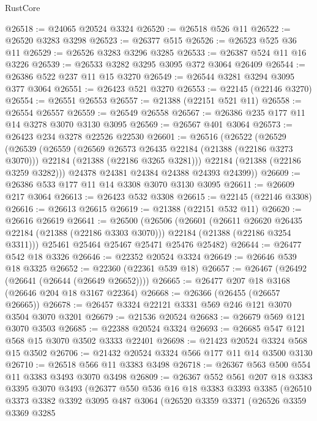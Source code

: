\begin{lexlean}{RustCore}
\begin{coremodule}
@26518 := @24065 @20524 @3324
@26520 := @26518 @526 @11
@26522 := @26520 @3283 @3298
@26523 := @26377 @515
@26526 := @26523 @525 @36 @11
@26529 := @26526 @3283 @3296 @3285
@26533 := @26387 @524 @11 @16 @3226
@26539 := @26533 @3282 @3295 @3095 @372 @3064 @26409
@26544 := @26386 @522 @237 @11 @15 @3270
@26549 := @26544 @3281 @3294 @3095 @377 @3064
@26551 := @26423 @521 @3270
@26553 := @22145 (@22146 @3270)
@26554 := @26551 @26553
@26557 := @21388 (@22151 @521 @11)
@26558 := @26554 @26557
@26559 := @26549 @26558
@26567 := @26386 @235 @177 @11 @14 @3278 @3070 @3130 @3095
@26569 := @26567 @401 @3064
@26573 := @26423 @234 @3278 @22526 @22530
@26601 := @26516
    (@26522
      (@26529
        (@26539
          (@26559
            (@26569 @26573 @26435 @22184 (@21388 (@22186 @3273 @3070)))
            @22184
            (@21388 (@22186 @3265 @3281)))
          @22184
          (@21388 (@22186 @3259 @3282)))
        @24378
        @24381
        @24384
        @24388
        @24393
        @24399))
@26609 := @26386 @533 @177 @11 @14 @3308 @3070 @3130 @3095
@26611 := @26609 @217 @3064
@26613 := @26423 @532 @3308
@26615 := @22145 (@22146 @3308)
@26616 := @26613 @26615
@26619 := @21388 (@22151 @532 @11)
@26620 := @26616 @26619
@26641 := @26500
    (@26506
      (@26601
        (@26611 @26620 @26435 @22184 (@21388 (@22186 @3303 @3070)))
        @22184
        (@21388 (@22186 @3254 @3311)))
      @25461
      @25464
      @25467
      @25471
      @25476
      @25482)
@26644 := @26477 @542 @18 @3326
@26646 := @22352 @20524 @3324
@26649 := @26646 @539 @18 @3325
@26652 := @22360 (@22361 @539 @18)
@26657 := @26467 (@26492 (@26641 (@26644 (@26649 @26652))))
@26665 := @26477 @207 @18 @3168 (@26646 @204 @18 @3167 @22364)
@26668 := @26366 (@26455 (@26657 @26665))
@26678 := @26457 @3324 @22121 @3331 @569 @246 @121 @3070 @3504 @3070 @3201
@26679 := @21536 @20524
@26683 := @26679 @569 @121 @3070 @3503
@26685 := @22388 @20524 @3324
@26693 := @26685 @547 @121 @568 @15 @3070 @3502 @3333 @22401
@26698 := @21423 @20524 @3324 @568 @15 @3502
@26706 := @21432 @20524 @3324 @566 @177 @11 @14 @3500 @3130
@26710 := @26518 @566 @11 @3383 @3498
@26718 := @26367 @563 @500 @554 @11 @3383 @3493 @3070 @3498
@26809 := @26367
    @552
    @561
    @207
    @18
    @3383
    @3395
    @3070
    @3493
    (@26377
      @550
      @536
      @16
      @18
      @3383
      @3393
      @3385
      (@26510
        @3373
        @3382
        @3392
        @3095
        @487
        @3064
        (@26520
          @3359
          @3371
          (@26526
            @3359
            @3369
            @3285

\end{coremodule}
\end{lexlean}
